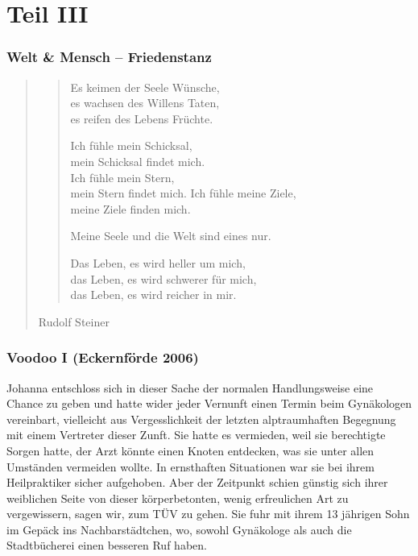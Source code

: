 \documentclass[10pt,titlepage,a5paper]{book}
\newenvironment{tg}{\begin{quote}\em}{\end{quote}}
\newenvironment{dichter}{\begin{flushright}}{\end{flushright}}
\begin{document}
\part*{Teil III}



\section*{Welt \& Mensch – Friedenstanz}


\begin{tg}
\begin{verse}
Es keimen der Seele Wünsche,\\
es wachsen des Willens Taten,\\
es reifen des Lebens Früchte.

Ich fühle mein Schicksal,\\
mein Schicksal findet mich.\\
Ich fühle mein Stern,\\
mein Stern findet mich.
Ich fühle meine Ziele,\\
meine Ziele finden mich.

Meine Seele und die Welt sind eines nur.

Das Leben, es wird heller um mich,\\
das Leben, es wird schwerer für mich,\\
das Leben, es wird reicher in mir.\\
\end{verse}


\begin{dichter}Rudolf Steiner\end{dichter}
\end{tg}

\section*{Voodoo I (Eckernförde 2006)}




Johanna entschloss sich in dieser Sache der normalen Handlungsweise eine Chance zu geben und hatte wider jeder Vernunft  einen Termin beim Gynäkologen vereinbart, vielleicht aus Vergesslichkeit der letzten alptraumhaften Begegnung mit einem Vertreter dieser Zunft. Sie hatte es vermieden, weil sie berechtigte Sorgen hatte, der Arzt könnte einen Knoten entdecken, was sie unter allen Umständen vermeiden wollte. In ernsthaften Situationen war sie bei ihrem Heilpraktiker sicher aufgehoben. Aber der Zeitpunkt schien günstig sich ihrer weiblichen Seite von dieser körperbetonten, wenig erfreulichen Art zu vergewissern, sagen wir, zum TÜV zu gehen. Sie fuhr mit ihrem 13 jährigen Sohn im Gepäck ins Nachbarstädtchen, wo, sowohl Gynäkologe als auch die Stadtbücherei einen besseren Ruf haben.
\end{document}
